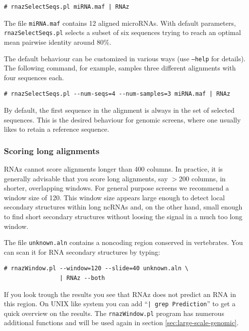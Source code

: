 \documentclass[11pt]{article}
\begin{document}
\begin{verbatim}
# rnazSelectSeqs.pl miRNA.maf | RNAz
\end{verbatim}

The file \texttt{miRNA.maf} contains 12 aligned microRNAs. With default
parameters,\\ \texttt{rnazSelectSeqs.pl} selects a subset of six sequences
trying to reach an optimal mean pairwise identity around 80\%.

The default behaviour can be customized in various ways (use
\texttt{--help} for details). The following command, for example, samples
three different alignments with four sequences each.

\begin{verbatim}
# rnazSelectSeqs.pl --num-seqs=4 --num-samples=3 miRNA.maf | RNAz
\end{verbatim}

By default, the first sequence in the alignment is always in the set of
selected sequences. This is the desired behaviour for genomic screens,
where one usually likes to retain a reference sequence.


\subsubsection{Scoring long alignments}
\label{sec:scor-long-alignm}

RNAz cannot score alignments longer than 400 columns. In practice, it is
generally advisable that you score long alignments, say $>$200 columns, in
shorter, overlapping windows. For general purpose screens we recommend a
window size of 120. This window size appears large enough to detect local
secondary structures within long ncRNAs and, on the other hand, small
enough to find short secondary structures without loosing the signal in a
much too long window.

The file \texttt{unknown.aln} contains a noncoding region conserved in
vertebrates. You can scan it for RNA secondary structures by typing:

\begin{verbatim}
# rnazWindow.pl --window=120 --slide=40 unknown.aln \
                | RNAz --both 
\end{verbatim}

If you look trough the results you see that RNAz does not predict an RNA in
this region. On UNIX like system you can add ``\texttt{| grep Prediction}''
to get a quick overview on the results. The \texttt{rnazWindow.pl} program
has numerous additional functions and will be used again in section
\ref{sec:large-scale-genomic}.
\end{document}
